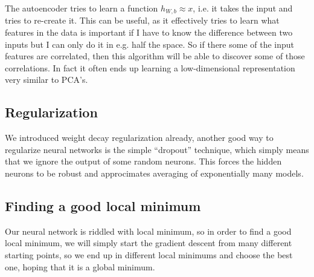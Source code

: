     The autoencoder tries to learn a function $h_{W,b}\approx x$, i.e. it takes 
    the input and tries to re-create it. This can be useful, as it effectively 
    tries to learn what features in the data is important if I have to know the 
    difference between two inputs but I can only do it in e.g. half the space. 
    So if there some of the input features are correlated, then this algorithm 
    will be able to discover some of those correlations. In fact it often ends 
    up learning a low-dimensional representation very similar to PCA's.
    
    \subsection{Regularization}
    We introduced weight decay regularization already, another good way to 
    regularize neural networks is the simple ``dropout'' technique, which 
    simply means that we ignore the output of some random neurons. This forces 
    the hidden neurons to be robust and approcimates averaging of exponentially 
    many models.
    
    \subsection{Finding a good local minimum}
    Our neural network is riddled with local minimum, so in order to find a 
    good local minimum, we will simply start the gradient descent from many 
    different starting points, so we end up in different local minimums and 
    choose the best one, hoping that it is a global minimum.
